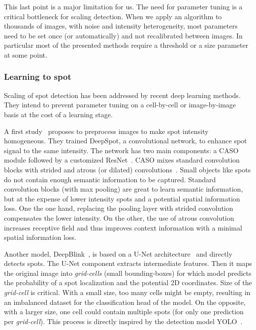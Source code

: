 This last point is a major limitation for us.
The need for parameter tuning is a critical bottleneck for scaling detection.
When we apply an algorithm to thousands of images, with noise and intensity heterogeneity, most parameters need to be set once (or automatically) and not recalibrated between images.
In particular most of the presented methods require a threshold or a size parameter at some point.


\subsubsection{Learning to spot}

Scaling of spot detection has been addressed by recent deep learning methods.
They intend to prevent parameter tuning on a cell-by-cell or image-by-image basis at the cost of a learning stage.

A first study~\cite{bouilhol_deepspot_2022} proposes to preprocess images to make spot intensity homogeneous.
They trained DeepSpot, a convolutional network, to enhance spot signal to the same intensity.
The network has two main components: a \ac{CASO} module followed by a customized ResNet~\cite{He_2016}.
\ac{CASO} mixes standard convolution blocks with strided and atrous (or dilated) convolutions~\cite{Hamaguchi_2018}.
Small objects like spots do not contain enough semantic information to be captured.
Standard convolution blocks (with max pooling) are great to learn semantic information, but at the expense of lower intensity spots and a potential spatial information loss.
One the one hand, replacing the pooling layer with strided convolution compensates the lower intensity.
On the other, the use of atrous convolution increases receptive field and thus improves context information with a minimal spatial information loss.

Another model, DeepBlink~\cite{eichenberger_deepblink_2021}, is based on a U-Net architecture~\cite{Ronneberger_2015} and directly detects spots.
The U-Net component extracts intermediate features.
Then it maps the original image into \emph{grid-cells} (small bounding-boxes) for which model predicts the probability of a spot localization and the potential 2D coordinates.
Size of the \emph{grid-cell} is critical.
With a small size, too many cells might be empty, resulting in an imbalanced dataset for the classification head of the model.
On the opposite, with a larger size, one cell could contain multiple spots (for only one prediction per \emph{grid-cell}).
This process is directly inspired by the detection model YOLO~\cite{Redmon_2016_CVPR}.

